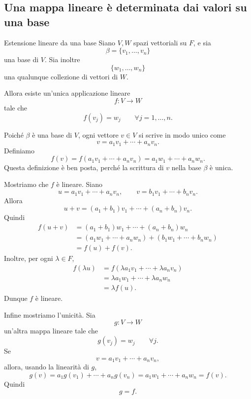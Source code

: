 \documentclass[a4paper]{article}
\begin{document}
\subsection{Una mappa lineare è determinata dai valori su una base}

\begin{snippetproposition}{Estensione lineare da una base}
    Siano \(V,W\) spazi vettoriali su \(F\), e sia
    \[
        \beta=\{v_1,\ldots,v_n\}
    \]
    una base di \(V\). Sia inoltre
    \[
        \{w_1,\ldots,w_n\}
    \]
    una qualunque collezione di vettori di \(W\).

    Allora esiste un'unica applicazione lineare
    \[
        f:V\to W
    \]
    tale che
    \[
        f(v_j)=w_j
        \qquad
        \forall j=1,\ldots,n.
    \]
\end{snippetproposition}

\begin{snippetproof}{}
    Poiché \(\beta\) è una base di \(V\), ogni vettore \(v\in V\) si scrive in modo unico come
    \[
        v=a_1v_1+\cdots+a_nv_n.
    \]
    Definiamo
    \[
        f(v)
        =
        f(a_1v_1+\cdots+a_nv_n)
        =
        a_1w_1+\cdots+a_nw_n.
    \]
    Questa definizione è ben posta, perché la scrittura di \(v\) nella base \(\beta\) è unica.

    Mostriamo che \(f\) è lineare. Siano
    \[
        u=a_1v_1+\cdots+a_nv_n,
        \qquad
        v=b_1v_1+\cdots+b_nv_n.
    \]
    Allora
    \[
        u+v=(a_1+b_1)v_1+\cdots+(a_n+b_n)v_n.
    \]
    Quindi
    \begin{align*}
        f(u+v)
        &=(a_1+b_1)w_1+\cdots+(a_n+b_n)w_n\\
        &=(a_1w_1+\cdots+a_nw_n)
        +
        (b_1w_1+\cdots+b_nw_n)\\
        &=f(u)+f(v).
    \end{align*}
    Inoltre, per ogni \(\lambda\in F\),
    \begin{align*}
        f(\lambda u)
        &=f(\lambda a_1v_1+\cdots+\lambda a_nv_n)\\
        &=\lambda a_1w_1+\cdots+\lambda a_nw_n\\
        &=\lambda f(u).
    \end{align*}
    Dunque \(f\) è lineare.

    Infine mostriamo l'unicità. Sia
    \[
        g:V\to W
    \]
    un'altra mappa lineare tale che
    \[
        g(v_j)=w_j
        \qquad
        \forall j.
    \]
    Se
    \[
        v=a_1v_1+\cdots+a_nv_n,
    \]
    allora, usando la linearità di \(g\),
    \[
        g(v)=a_1g(v_1)+\cdots+a_ng(v_n)=a_1w_1+\cdots+a_nw_n=f(v).
    \]
    Quindi
    \[
        g=f.
    \]
\end{snippetproof}
\end{document}
